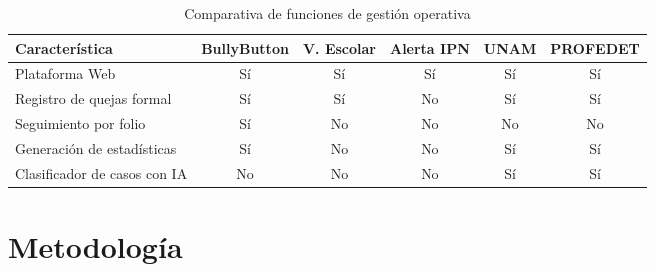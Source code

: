         \begin{table}[h]
        \centering
        \caption{Comparativa de funciones de gestión operativa}
        \label{tab:comparativa}
        \begin{tabular}{|p{2.5cm}|c|c|c|c|c|}
            \hline
            \textbf{Característica} & \textbf{BullyButton} & \textbf{V. Escolar} & \textbf{Alerta IPN} & \textbf{UNAM} & \textbf{PROFEDET} \\
            \hline
            Plataforma Web & Sí & Sí & Sí & Sí & Sí \\
            \hline
            Registro de quejas formal & Sí & Sí & No & Sí & Sí \\
            \hline
            Seguimiento por folio & Sí & No & No & No & No \\
            \hline
            Generación de estadísticas & Sí & No & No & Sí & Sí \\
            \hline
            Clasificador de casos con IA & No & No & No & Sí & Sí \\
            \hline
        \end{tabular}
        \end{table}

\section{Metodología}

